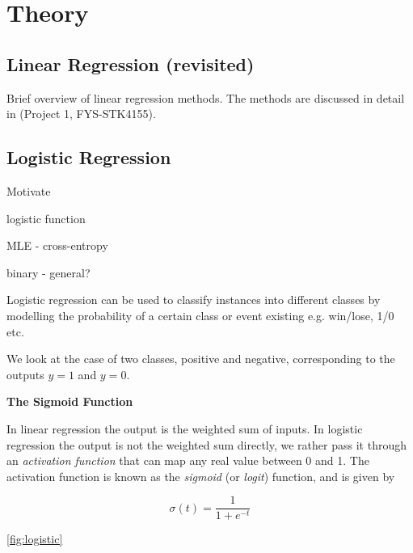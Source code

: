 \section{Theory}\label{sec:Theory}

\subsection{Linear Regression (revisited)}\label{sec:linreg theory}
Brief overview of linear regression methods. The methods are discussed in detail in (Project 1, FYS-STK4155).


\subsection{Logistic Regression}\label{sec:logreg theory}
Motivate

logistic function

MLE - cross-entropy

binary - general?

Logistic regression can be used to classify instances into different classes by modelling the probability of a certain class or event existing e.g. win/lose, 1/0 etc. 

We look at the case of two classes, positive and negative, corresponding to the outputs $y=1$ and $y=0$.

\textbf{The Sigmoid Function}

In linear regression the output is the weighted sum of inputs. In logistic regression the output is not the weighted sum directly, we rather pass it through an \textit{activation function} that can map any real value between 0 and 1. The activation function is known as the \textit{sigmoid} (or \textit{logit}) function, and is given by

\begin{equation}\label{eq:sigmoid_func}
    \sigma (t) = \frac{1}{1+ e^{-t}}
\end{equation}

\autoref{fig:logistic}

